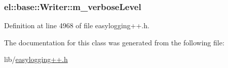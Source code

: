 \hypertarget{classel_1_1base_1_1_writer_a335803052b6878c058a4a888279df04d}{}
\subsubsection[{m\+\_\+verbose\+Level}]{ el\+::base\+::\+Writer\+::m\+\_\+verbose\+Level\hspace{0.3cm}{\ttfamily [protected]}}\label{classel_1_1base_1_1_writer_a335803052b6878c058a4a888279df04d}


Definition at line 4968 of file easylogging++.\+h.



The documentation for this class was generated from the following file\+:\begin{DoxyCompactItemize}
\item 
lib/\hyperlink{easylogging_09_09_8h}{easylogging++.\+h}\end{DoxyCompactItemize}
